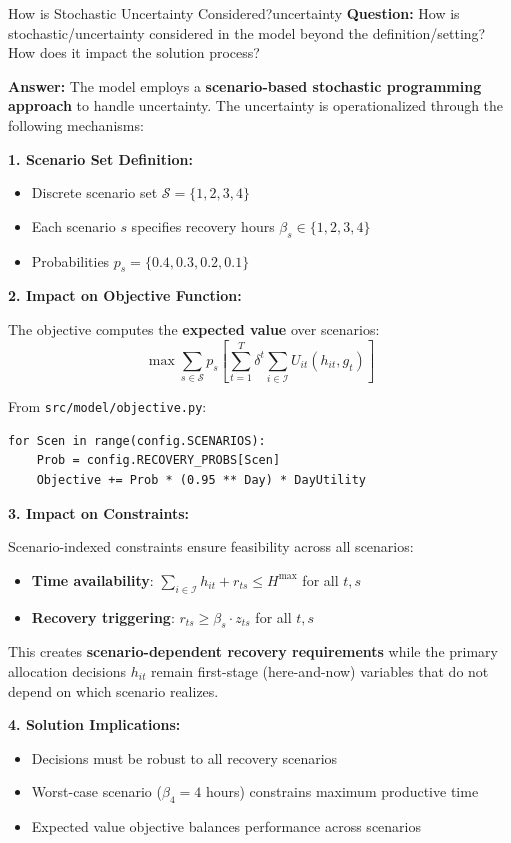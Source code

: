 \documentclass[11pt,a4paper]{article}
\begin{document}
\begin{questionbox}{How is Stochastic Uncertainty Considered?}{uncertainty}
\textbf{Question:} How is stochastic/uncertainty considered in the model beyond the definition/setting? How does it impact the solution process?

\textbf{Answer:} The model employs a \textbf{scenario-based stochastic programming approach} to handle uncertainty. The uncertainty is operationalized through the following mechanisms:

\textbf{1. Scenario Set Definition:}
\begin{itemize}
    \item Discrete scenario set $\mathcal{S} = \{1, 2, 3, 4\}$
    \item Each scenario $s$ specifies recovery hours $\beta_s \in \{1, 2, 3, 4\}$
    \item Probabilities $p_s = \{0.4, 0.3, 0.2, 0.1\}$
\end{itemize}

\textbf{2. Impact on Objective Function:}

The objective computes the \textbf{expected value} over scenarios:
$$\max \sum_{s \in \mathcal{S}} p_s \left[ \sum_{t=1}^T \delta^t \sum_{i \in \mathcal{I}} U_{it}(h_{it}, g_t) \right]$$

From \texttt{src/model/objective.py}:
\begin{verbatim}
for Scen in range(config.SCENARIOS):
    Prob = config.RECOVERY_PROBS[Scen]
    Objective += Prob * (0.95 ** Day) * DayUtility
\end{verbatim}

\textbf{3. Impact on Constraints:}

Scenario-indexed constraints ensure feasibility across all scenarios:
\begin{itemize}
    \item \textbf{Time availability}: $\sum_{i \in \mathcal{I}} h_{it} + r_{ts} \leq H^{\max}$ for all $t, s$
    \item \textbf{Recovery triggering}: $r_{ts} \geq \beta_s \cdot z_{ts}$ for all $t, s$
\end{itemize}

This creates \textbf{scenario-dependent recovery requirements} while the primary allocation decisions $h_{it}$ remain first-stage (here-and-now) variables that do not depend on which scenario realizes.

\textbf{4. Solution Implications:}
\begin{itemize}
    \item Decisions must be robust to all recovery scenarios
    \item Worst-case scenario ($\beta_4 = 4$ hours) constrains maximum productive time
    \item Expected value objective balances performance across scenarios
\end{itemize}
\end{questionbox}
\end{document}
